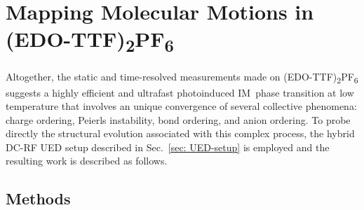 
\section{Mapping Molecular Motions in (EDO-TTF)\textsubscript{2}PF\textsubscript{6}}
\label{sec: UED-EDOPF6}

Altogether, the static and time-resolved measurements made on (EDO-TTF)\textsubscript{2}PF\textsubscript{6}
suggests a highly efficient and ultrafast photoinduced IM~phase transition at low temperature
that involves an unique convergence of several collective phenomena:
charge ordering, Peierls instability, bond ordering, and anion ordering.
%
To probe directly the structural evolution associated with this complex process,
the hybrid DC-RF UED setup described in Sec.~\ref{sec: UED-setup} is employed
and the resulting work is described as follows.

\subsection{Methods}

